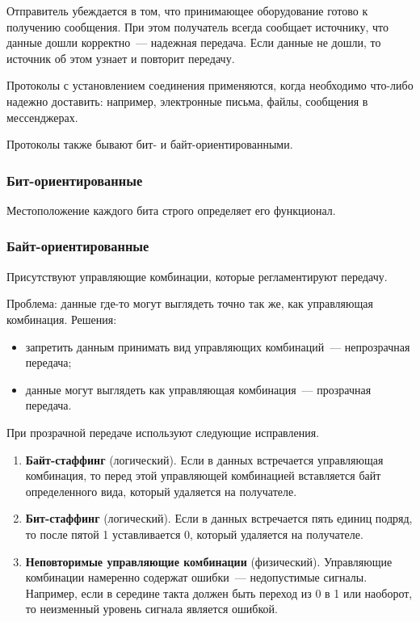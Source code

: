 Отправитель убеждается в том, что принимающее оборудование готово к получению сообщения. При этом получатель всегда сообщает источнику, что данные дошли корректно~--- надежная передача. Если данные не дошли, то источник об этом узнает и повторит передачу.

Протоколы с установлением соединения применяются, когда необходимо что-либо надежно доставить: например, электронные письма, файлы, сообщения в мессенджерах.

Протоколы также бывают бит- и байт-ориентированными.

\subsubsection{Бит-ориентированные}

Местоположение каждого бита строго определяет его функционал.

\subsubsection{Байт-ориентированные}

Присутствуют управляющие комбинации, которые регламентируют передачу.

Проблема: данные где-то могут выглядеть точно так же, как управляющая комбинация. Решения:

\begin{itemize}
    \item запретить данным принимать вид управляющих комбинаций~--- непрозрачная передача;
    \item данные могут выглядеть как управляющая комбинация~--- прозрачная передача.
\end{itemize}

При прозрачной передаче используют следующие исправления.

\begin{enumerate}
    \item \textbf{Байт-стаффинг} (логический). Если в данных встречается управляющая комбинация, то перед этой управляющей комбинацией вставляется байт определенного вида, который удаляется на получателе.
    \item \textbf{Бит-стаффинг} (логический). Если в данных встречается пять единиц подряд, то после пятой 1 уставливается 0, который удаляется на получателе.
    \item \textbf{Неповторимые управляющие комбинации} (физический). Управляющие комбинации намеренно содержат ошибки~--- недопустимые сигналы. Например, если в середине такта должен быть переход из 0 в 1 или наоборот, то неизменный уровень сигнала является ошибкой.
\end{enumerate}

